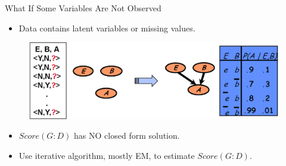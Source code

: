 \documentclass[hyperref={pdfpagelabels=false}]{beamer}
\begin{document}
\begin{frame}{What If Some Variables Are Not Observed}

	\begin{itemize}\small
		\item Data contains latent variables or missing values.	
	\end{itemize}		
	\begin{figure}%
		\begin{center}
			\includegraphics[scale = .5]{figures/bnlatent.png}%
		\end{center}
	\end{figure}
	
	\begin{itemize}\small
		\item $Score(G:D)$ has NO closed form solution.
		\item Use iterative algorithm, mostly EM, to estimate $Score(G:D)$.
	\end{itemize}
\end{frame}
\end{document}
